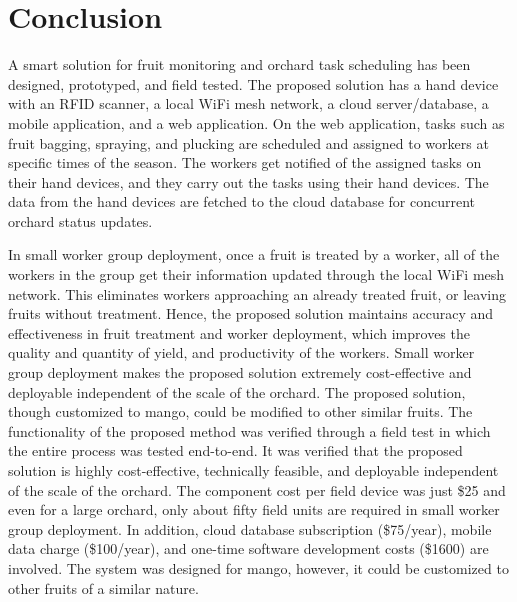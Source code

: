 \documentclass[journal]{IEEEtran}
\begin{document}
\section{Conclusion}
A smart solution for fruit monitoring and orchard task scheduling has been designed, prototyped, and field tested. The proposed solution has a hand device with an RFID scanner, a local WiFi mesh network, a cloud server/database, a mobile application, and a web application. On the web application, tasks such as fruit bagging, spraying, and plucking are scheduled and assigned to workers at specific times of the season. The workers get notified of the assigned tasks on their hand devices, and they carry out the tasks using their hand devices. The data from the hand devices are fetched to the cloud database for concurrent orchard status updates.\par
In small worker group deployment, once a fruit is treated by a worker, all of the workers in the group get their information updated through the local WiFi mesh network. This eliminates workers approaching an already treated fruit, or leaving fruits without treatment. Hence, the proposed solution maintains accuracy and effectiveness in fruit treatment and worker deployment, which improves the quality and quantity of yield, and productivity of the workers. Small worker group deployment makes the proposed solution extremely cost-effective and deployable independent of the scale of the orchard. The proposed solution, though customized to mango, could be modified to other similar fruits.
The functionality of the proposed method was verified through a field test in which the entire process was tested end-to-end. It was verified that the proposed solution is highly cost-effective, technically feasible, and deployable independent of the scale of the orchard. The component cost per field device was just \$25 and even for a large orchard, only about fifty field units are required in small worker group deployment. In addition, cloud database subscription (\$75/year), mobile data charge (\$100/year), and one-time software development costs (\$1600) are involved. The system was designed for mango, however, it could be customized to other fruits of a similar nature.
\end{document}
